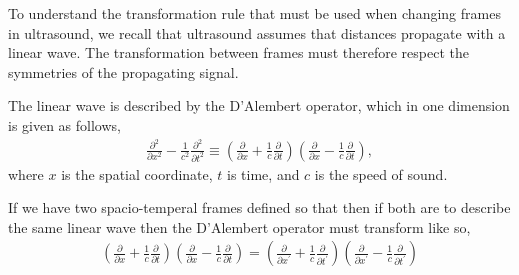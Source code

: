 
To understand the transformation rule that must be used when changing frames in ultrasound,
we  recall that ultrasound assumes that distances propagate with a linear wave.
The transformation between frames must therefore respect the symmetries of the propagating signal.


The linear wave is described by the D'Alembert operator, which in one dimension is given as follows,
\begin{align}
  \frac{\partial^2 }{\partial x^2} - \frac{1}{c^2}\frac{\partial^2 }{\partial t^2} \equiv
  \left(\frac{\partial }{\partial x}  + \frac{1}{c}\frac{\partial }{\partial t}\right)
  \left(\frac{\partial }{\partial x}  - \frac{1}{c}\frac{\partial }{\partial t}\right),
\end{align}
where $x$ is the spatial coordinate, $t$ is time, and $c$ is the speed of sound.

If we have two spacio-temperal frames defined so that
then if both are to describe the same linear wave then the D'Alembert operator must transform like so,
\begin{align}
  \left(\frac{\partial }{\partial x}  + \frac{1}{c}\frac{\partial }{\partial t}\right)
  \left(\frac{\partial }{\partial x}  - \frac{1}{c}\frac{\partial }{\partial t}\right) =
  \left(\frac{\partial }{\partial x^\prime}  + \frac{1}{c}\frac{\partial }{\partial t^\prime}\right)
  \left(\frac{\partial }{\partial x^\prime}  - \frac{1}{c}\frac{\partial }{\partial t^\prime}\right)
\end{align}

